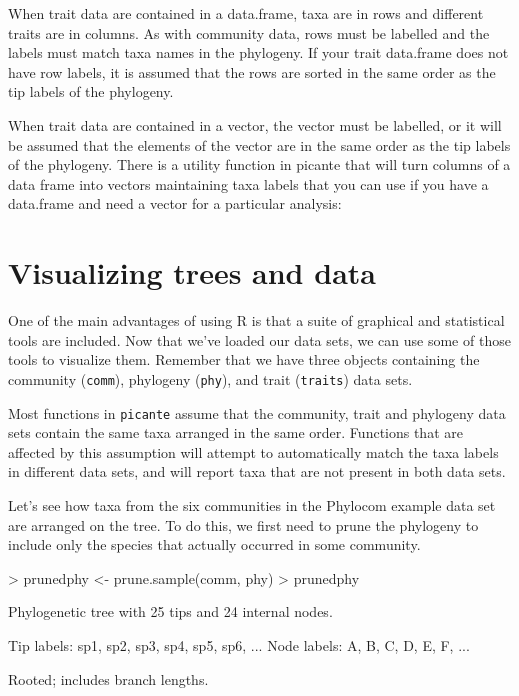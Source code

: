 \documentclass[12pt]{article}
\begin{document}
When trait data are contained in a data.frame, taxa are in rows and different traits are in columns. As with community data, rows must be labelled and the labels must match taxa names in the phylogeny. If your trait data.frame does not have row labels, it is assumed that the rows are sorted in the same order as the tip labels of the phylogeny.

When trait data are contained in a vector, the vector must be labelled, or it will be assumed that the elements of the vector are in the same order as the tip labels of the phylogeny. There is a utility function in picante that will turn columns of a data frame into vectors maintaining taxa labels that you can use if you have a data.frame and need a vector for a particular analysis:


\section{Visualizing trees and data}

One of the main advantages of using R is that a suite of graphical and statistical tools are included. Now that we've loaded our data sets, we can use some of those tools to visualize them. Remember that we have three objects containing the community (\texttt{comm}), phylogeny (\texttt{phy}), and trait (\texttt{traits}) data sets.

Most functions in \texttt{picante} assume that the community, trait and phylogeny data sets contain the same taxa arranged in the same order. Functions that are affected by this assumption will attempt to automatically match the taxa labels in different data sets, and will report taxa that are not present in both data sets.

Let's see how taxa from the six communities in the Phylocom example data set are arranged on the tree. To do this, we first need to prune the phylogeny to include only the species that actually occurred in some community.

\begin{Schunk}
\begin{Sinput}
> prunedphy <- prune.sample(comm, phy)
> prunedphy
\end{Sinput}
\begin{Soutput}
Phylogenetic tree with 25 tips and 24 internal nodes.

Tip labels:
  sp1, sp2, sp3, sp4, sp5, sp6, ...
Node labels:
  A, B, C, D, E, F, ...

Rooted; includes branch lengths.
\end{Soutput}
\end{Schunk}
\end{document}
